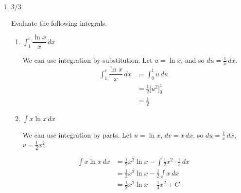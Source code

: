 \documentclass{article}
\begin{document}
\begin{enumerate}
\pspace{\newpage}
    
    \item 

    \begin{grading}
        3/3
    \end{grading}

    \begin{problem}
    Evaluate the following integrals.
    \end{problem}
    
    \begin{enumerate}
        \item 
        \begin{problem}
        $\displaystyle \int_{1}^{e} \dfrac{\ln x}{x} \, dx$
        \end{problem}
        \pspace{\vfill}

        \begin{solution}
            We can use integration by substitution. Let $u=\ln x$, and so $du = \tfrac{1}{x}\,dx$.
            \begin{align*}
                \int_{1}^{e} \dfrac{\ln x}{x} \, dx &= \int_0^1 u\,du \\
                &= \tfrac{1}{2}\big[u^2\big]_0^1\\
                &= \boxed{\frac{1}{2}}
            \end{align*}
        \end{solution}
        
        \item 
        \begin{problem}
        $\displaystyle \int x\ln x\, dx$
        \end{problem}
        \pspace{\vfill}

        \begin{solution}
            We can use integration by parts. Let $u=\ln x$, $dv = x\,dx$, so $du = \tfrac{1}{x}\,dx$, $v=\frac{1}{2}x^2$.

            \begin{align*}
                \int x\ln x\, dx &= \frac{1}{2}x^2\ln x - \int\frac{1}{2}x^2\cdot \frac{1}{x}\,dx\\
                &= \frac{1}{2}x^2\ln x - \frac{1}{2}\int x\,dx \\
                &= \boxed{\frac{1}{2}x^2\ln x - \frac{1}{4}x^2 + C}
            \end{align*}
        \end{solution}
    \end{enumerate}


\end{enumerate}
\end{document}
